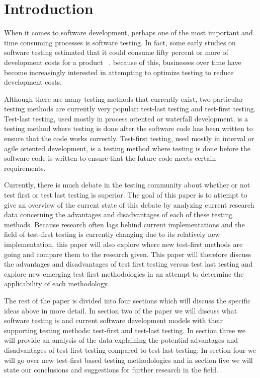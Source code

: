 \documentclass{sig-alternate}
\begin{document}


\section{Introduction}
When it comes to software development, perhaps one of the most important and time consuming processes is software testing.  In fact, some early studies on software testing estimated that it could consume fifty percent or more of development costs for a product ~\cite{Bertolino:2007}.  because of this, businesses over time have become increasingly interested in attempting to optimize testing to reduce development costs.

Although there are many testing methods that currently exist, two particular testing methods are currently very popular: test-last testing and test-first testing.  Test-last testing, used mostly in process oriented or waterfall development, is a testing method where testing is done after the software code has been written to ensure that the code works correctly.  Test-first testing, used mostly in interval or agile oriented development, is a testing method where testing is done before the software code is written to ensure that the future code meets certain requirements.

Currently, there is much debate in the testing community about whether or not test first or test last testing is superior.  The goal of this paper is to attempt to give an overview of the current state of this debate by analyzing current research data concerning the advantages and disadvantages of each of these testing methods.  Because research often lags behind current implementations and the field of test-first testing is currently changing due to its relatively new implementation, this paper will also explore where new test-first methods are going and compare them to the research given.  This paper will therefore discuss the advantages and disadvantages of test first testing versus test last testing and explore new emerging test-first methodologies in an attempt to determine the applicability of each methodology.

The rest of the paper is divided into four sections which will discuss the specific ideas above in more detail. In section two of the paper we will discuss what software testing is and current software development models with their supporting testing methods: test-first and test-last testing.  In section three we will provide an analysis of the data explaining the potential advantages and disadvantages of test-first testing compared to test-last testing.  In section four we will go over new test-first based testing methodologies and in section five we will state our conclusions and suggestions for further research in the field.
\end{document}
